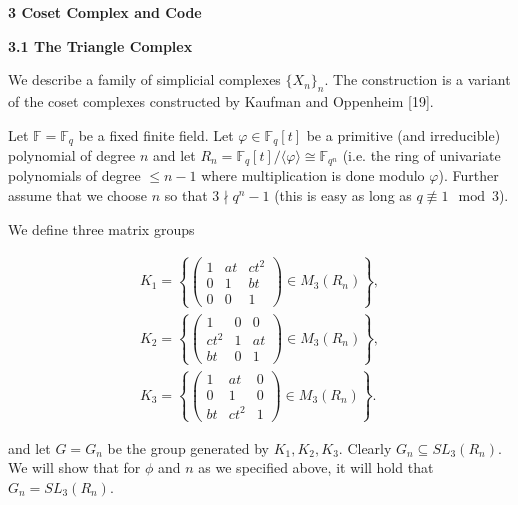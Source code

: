 \documentclass[10pt,a4paper]{article}
\begin{document}
\par\medskip\noindent\textbf{
3 Coset Complex and Code}\par




\par\medskip\noindent\textbf{
3.1 The Triangle Complex}\par




We describe a family of simplicial complexes $\{X_{n}\}_{n}$.
The construction is a variant of the coset complexes constructed by Kaufman and Oppenheim [19].\par




Let $\mathbb{F}=\mathbb{F}_{q}$ be a fixed finite field. Let $\varphi\in\mathbb{F}_{q}[t]$ be a primitive (and irreducible) polynomial of degree $n$ and let  $R_{n}=\mathbb{F}_{q}[t]/\langle\varphi\rangle\cong\mathbb{F}_{q^{n}}$ (i.e. the ring of univariate polynomials of degree $\leq n-1$ where multiplication is done modulo $\varphi$). Further assume that we choose $n$ so that $3\nmid q^{n}-1$ (this is easy as long as $q\not\equiv 1\mod 3$).\par




We define three matrix groups\par


\[\begin{gathered}
\displaystyle K_{1}=\left\{\begin{pmatrix}1&at&ct^{2}\\
0&1&bt\\
0&0&1\end{pmatrix}\in M_{3}(R_{n})\right\}, \\
\displaystyle K_{2}=\left\{\begin{pmatrix}1&0&0\\
ct^{2}&1&at\\
bt&0&1\end{pmatrix}\in M_{3}(R_{n})\right\}, \\
\displaystyle K_{3}=\left\{\begin{pmatrix}1&at&0\\
0&1&0\\
bt&ct^{2}&1\end{pmatrix}\in M_{3}(R_{n})\right\}.
\end{gathered}\]


and let $G=G_{n}$ be the group generated by $K_{1},K_{2},K_{3}$.
Clearly $G_{n}\subseteq SL_{3}(R_{n})$. We will show that for $\phi$ and $n$ as we specified above, it will hold that $G_{n}=SL_{3}(R_{n})$.\par
\end{document}
